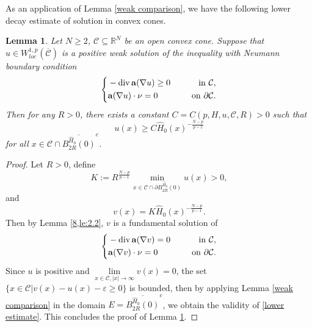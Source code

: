 \documentclass[12pt]{amsart}
\newtheorem{lem}[thm]{Lemma}
\theoremstyle{definition}
\theoremstyle{remark}
\theoremstyle{conclusion}
\theoremstyle{conjecture}
\numberwithin{equation}{section}
\begin{document}
As an application of Lemma \ref{weak comparison}, we have the following lower decay estimate of solution in convex cones.
\begin{lem}\label{lower decay}
Let $N\geq2$, $\mathcal{C}\subseteq\mathbb{R}^{N}$ be an open convex cone. Suppose that $u\in W^{1,p}_{loc}(\overline{\mathcal{C}})$ is a positive weak solution of the inequality with Neumann boundary condition
\begin{equation*}
      \left\{
          \begin{aligned}
          &-\operatorname{div}{\bf{a}}(\nabla u)\geq0 \quad\,\,\, &{\rm{in}} \,\, \mathcal{C}, \\
          &{\bf{a}}(\nabla u)\cdot \nu =0 \quad\,\,\, &{\rm{on}} \,\, \partial\mathcal{C}.
          \end{aligned}
          \right.
    \end{equation*}
Then for any $R>0$, there exists a constant $C=C(p,H,u,\mathcal{C},R)>0$ such that
\begin{equation}\label{lower estimate}
  u(x)\geq C \widehat{H}_0(x) ^{-\frac{N-p}{p-1}}
\end{equation}
for all $x\in\mathcal{C}\cap \overline{B^{\widehat{H}_0}_{2R}(0)}^c$.
\end{lem}

\begin{proof}
Let $R>0$, define
$$K:=R^{\frac{N-p}{p-1}}\min\limits_{x\in\mathcal{C}\cap \partial B^{\widehat{H}_0}_{2R}(0)}u(x)>0,$$
and
$$v(x)=K\widehat{H}_0(x)^{-\frac{N-p}{p-1}}.$$
Then by Lemma \ref{8,le:2.2}, $v$ is a fundamental solution of
\begin{equation*}
      \left\{
          \begin{aligned}
          &-\operatorname{div}{\bf{a}}(\nabla v)=0 \quad\,\,\, &{\rm{in}} \,\, \mathcal{C}, \\
          &{\bf{a}}(\nabla v)\cdot \nu =0 \quad\,\,\, &{\rm{on}} \,\, \partial\mathcal{C}.
          \end{aligned}
          \right.
    \end{equation*}
Since $u$ is positive and $\lim\limits_{x\in\mathcal{C},|x|\rightarrow\infty}v(x)=0$, the set $\{x\in\mathcal{C}|v(x)-u(x)-\varepsilon\geq 0\}$ is bounded, then by applying Lemma \ref{weak comparison} in the domain $E=\overline{B^{\widehat{H}_0}_{2R}(0)}^c$, we obtain the validity of \eqref{lower estimate}. This concludes the proof of Lemma \ref{lower decay}.
\end{proof}
\end{document}

